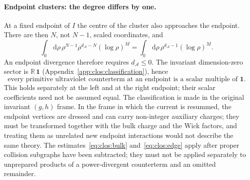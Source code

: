 \documentclass[11pt,a4paper]{article}
\numberwithin{equation}{section}
\newcommand{\dd}{\,\mathrm d}
\begin{document}
\paragraph{Endpoint clusters: the degree differs by one.} At a fixed endpoint of $I$ the centre of the cluster also
approaches the endpoint. There are then $N$, not $N-1$, scaled coordinates, and
\begin{equation}
 \int_0\dd\rho\,\rho^{N-1}\rho^{d_{\mathcal A}-N}(\log\rho)^M=\int_0\dd\rho\,\rho^{d_{\mathcal A}-1}(\log\rho)^M .
 \label{eq:clos:edge}
\end{equation}
An endpoint divergence therefore requires $d_{\mathcal A}\le0$. The invariant dimension-zero sector is
$\mathbb R\,\mathbf 1$ (Appendix~\ref{app:clos:classification}), hence
\begin{equation}
 \text{every primitive ultraviolet counterterm at an endpoint is a scalar multiple of }\mathbf 1 .
 \label{eq:clos:scalaredge}
\end{equation}
This holds separately at the left and at the right endpoint; their scalar coefficients need not be assumed equal. The
classification is made in the original invariant $(g,h)$ frame. In the frame in which the current is resummed, the
endpoint vertices are dressed and can carry non-integer auxiliary charges; they must be transformed together with the
bulk charge and the Wick factors, and treating them as unrelated new endpoint interactions would not describe the same
theory. The estimates~\eqref{eq:clos:bulk} and~\eqref{eq:clos:edge} apply after proper collision subgraphs have been
subtracted; they must not be applied separately to unprepared products of a power-divergent counterterm and an omitted
remainder.
\end{document}
